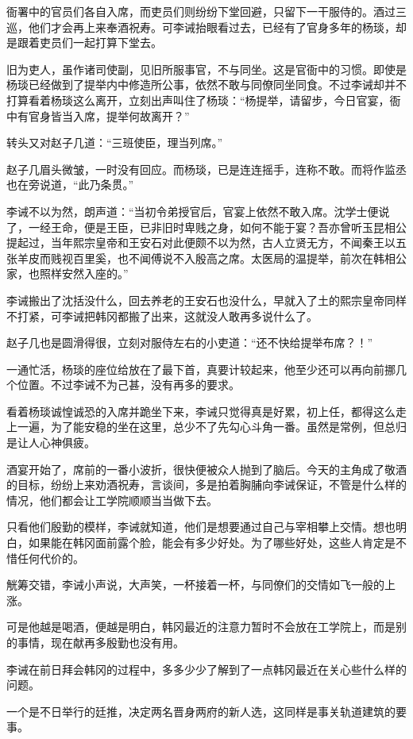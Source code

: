 衙署中的官员们各自入席，而吏员们则纷纷下堂回避，只留下一干服侍的。酒过三巡，他们才会再上来奉酒祝寿。可李诫抬眼看过去，已经有了官身多年的杨琰，却是跟着吏员们一起打算下堂去。

旧为吏人，虽作诸司使副，见旧所服事官，不与同坐。这是官衙中的习惯。即使是杨琰已经做到了提举内中修造所公事，依然不敢与同僚同坐同食。不过李诫却并不打算看着杨琰这么离开，立刻出声叫住了杨琰：“杨提举，请留步，今日官宴，衙中有官身皆当入席，提举何故离开？”

转头又对赵子几道：“三班使臣，理当列席。”

赵子几眉头微皱，一时没有回应。而杨琰，已是连连摇手，连称不敢。而将作监丞也在旁说道，“此乃条贯。”

李诫不以为然，朗声道：“当初令弟授官后，官宴上依然不敢入席。沈学士便说了，一经王命，便是王臣，已非旧时卑贱之身，如何不能于宴？吾亦曾听玉昆相公提起过，当年熙宗皇帝和王安石对此便颇不以为然，古人立贤无方，不闻秦王以五张羊皮而贱视百里奚，也不闻傅说不入殷高之席。太医局的温提举，前次在韩相公家，也照样安然入座的。”

李诫搬出了沈括没什么，回去养老的王安石也没什么，早就入了土的熙宗皇帝同样不打紧，可李诫把韩冈都搬了出来，这就没人敢再多说什么了。

赵子几也是圆滑得很，立刻对服侍左右的小吏道：“还不快给提举布席？！”

一通忙活，杨琰的座位给放在了最下首，真要计较起来，他至少还可以再向前挪几个位置。不过李诫不为己甚，没有再多的要求。

看着杨琰诚惶诚恐的入席并跪坐下来，李诫只觉得真是好累，初上任，都得这么走上一遍，为了能安稳的坐在这里，总少不了先勾心斗角一番。虽然是常例，但总归是让人心神俱疲。

酒宴开始了，席前的一番小波折，很快便被众人抛到了脑后。今天的主角成了敬酒的目标，纷纷上来劝酒祝寿，言谈间，多是拍着胸脯向李诫保证，不管是什么样的情况，他们都会让工学院顺顺当当做下去。

只看他们殷勤的模样，李诫就知道，他们是想要通过自己与宰相攀上交情。想也明白，如果能在韩冈面前露个脸，能会有多少好处。为了哪些好处，这些人肯定是不惜任何代价的。

觥筹交错，李诫小声说，大声笑，一杯接着一杯，与同僚们的交情如飞一般的上涨。

可是他越是喝酒，便越是明白，韩冈最近的注意力暂时不会放在工学院上，而是别的事情，现在献再多殷勤也没有用。

李诫在前日拜会韩冈的过程中，多多少少了解到了一点韩冈最近在关心些什么样的问题。

一个是不日举行的廷推，决定两名晋身两府的新人选，这同样是事关轨道建筑的要事。

